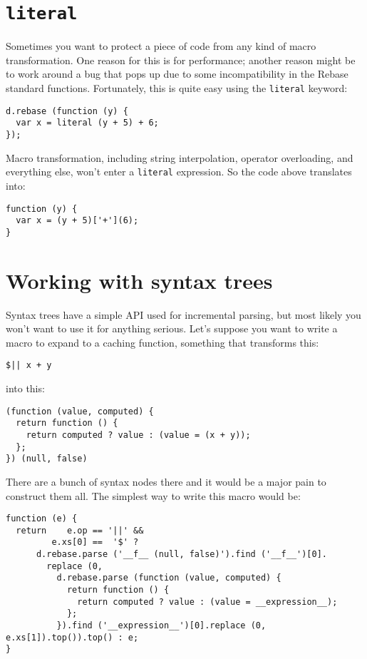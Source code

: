 \documentclass{report}
\begin{document}
\section {{\tt literal}}
      Sometimes you want to protect a piece of code from any kind of macro transformation. One reason for this is for performance; another reason might be to work around a bug that pops up due
      to some incompatibility in the Rebase standard functions. Fortunately, this is quite easy using the \verb|literal| keyword:

\begin{verbatim}
d.rebase (function (y) {
  var x = literal (y + 5) + 6;
});
\end{verbatim}

      Macro transformation, including string interpolation, operator overloading, and everything else, won't enter a \verb|literal| expression. So the code above translates into:

\begin{verbatim}
function (y) {
  var x = (y + 5)['+'](6);
}
\end{verbatim}

\section {Working with syntax trees}
      Syntax trees have a simple API used for incremental parsing, but most likely you won't want to use it for anything serious. Let's suppose you want to write a macro to expand to a caching
      function, something that transforms this:

\begin{verbatim}
$|| x + y
\end{verbatim}

      \noindent into this:

\begin{verbatim}
(function (value, computed) {
  return function () {
    return computed ? value : (value = (x + y));
  };
}) (null, false)
\end{verbatim}

      There are a bunch of syntax nodes there and it would be a major pain to construct them all. The simplest way to write this macro would be:

\begin{verbatim}
function (e) {
  return    e.op == '||' &&
         e.xs[0] ==  '$' ?
      d.rebase.parse ('__f__ (null, false)').find ('__f__')[0].
        replace (0,
          d.rebase.parse (function (value, computed) {
            return function () {
              return computed ? value : (value = __expression__);
            };
          }).find ('__expression__')[0].replace (0, e.xs[1]).top()).top() : e;
}
\end{verbatim}
\end{document}
